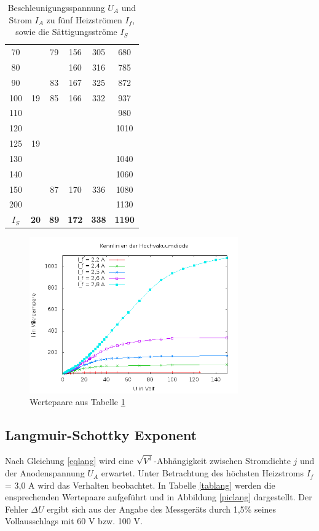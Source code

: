 \begin{table}[H]
\begin{tabular}{|c||c|c|c|c|c|}
70&	&	79&	156&	305&	680\\
80&	&	&	160&	316&	785\\
90&	&	83&	167&	325&	872\\
100&	19&	85&	166&	332&	937\\
110&	&	&	&	&	980\\
120&	&	&	&	&	1010\\
125&	19&	&	&	&	\\
130	&	&	&	&	&1040\\
140&	&	&	&		&1060\\
150&	&	87&	170&	336&	1080\\
200&	&	&	&	&	1130\\
\hline
\textbf{$I_S$} & \textbf{20} & \textbf{89} & \textbf{172} & \textbf{338} & \textbf{1190} \\
\hline
\end{tabular}
\caption{Beschleunigungsspannung $U_A$ und Strom $I_A$ zu fünf Heizströmen $I_f$, sowie die Sättigungsströme $I_S$}
\label{tabheiz}
\end{table}
\renewcommand{\arraystretch}{1}


\begin{figure}[H]
\includegraphics[width=0.8\textwidth]{pics/504a.png}
\caption{Wertepaare aus Tabelle \ref{tabheiz}}
\label{picheiz}
\end{figure}

\subsection{Langmuir-Schottky Exponent}
\label{expo}
Nach Gleichung \eqref{eqlang} wird eine $\sqrt{V^3}$-Abhängigkeit zwischen Stromdichte $j$ und der Anodenspannung $U_A$ erwartet. Unter
Betrachtung des höchsten Heizstroms $I_f$ = 3,0 A wird das Verhalten beobachtet. In Tabelle \ref{tablang} werden die ensprechenden Wertepaare
aufgeführt und in Abbildung \ref{piclang} dargestellt. Der Fehler $\Delta U$ ergibt sich aus der Angabe des Messgeräts durch 1,5\% seines
Vollausschlags mit 60 V bzw. 100 V. 

